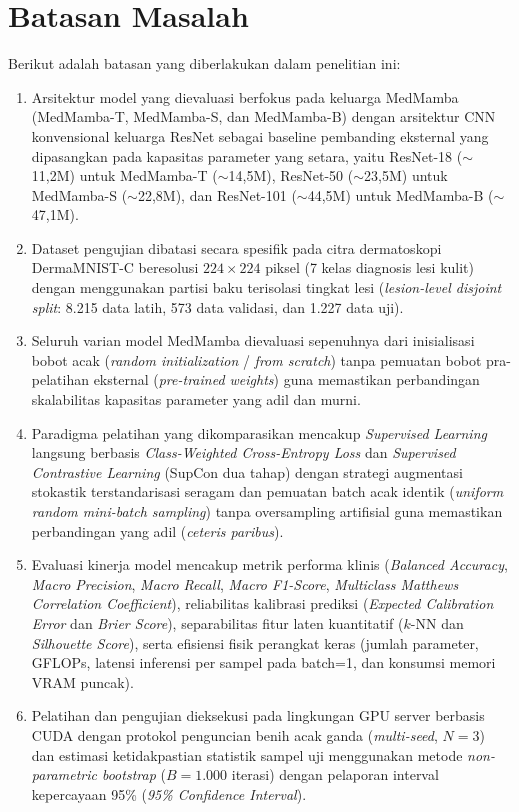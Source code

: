 \section{Batasan Masalah} \label{I.Batasan}
Berikut adalah batasan yang diberlakukan dalam penelitian ini: \par 

\begin{enumerate}[noitemsep]
    \item Arsitektur model yang dievaluasi berfokus pada keluarga MedMamba (MedMamba-T, MedMamba-S, dan MedMamba-B) dengan arsitektur CNN konvensional keluarga ResNet sebagai baseline pembanding eksternal yang dipasangkan pada kapasitas parameter yang setara, yaitu ResNet-18 ($\sim$11,2M) untuk MedMamba-T ($\sim$14,5M), ResNet-50 ($\sim$23,5M) untuk MedMamba-S ($\sim$22,8M), dan ResNet-101 ($\sim$44,5M) untuk MedMamba-B ($\sim$47,1M).
    \item Dataset pengujian dibatasi secara spesifik pada citra dermatoskopi DermaMNIST-C beresolusi $224 \times 224$ piksel (7 kelas diagnosis lesi kulit) dengan menggunakan partisi baku terisolasi tingkat lesi (\textit{lesion-level disjoint split}: 8.215 data latih, 573 data validasi, dan 1.227 data uji).
    \item Seluruh varian model MedMamba dievaluasi sepenuhnya dari inisialisasi bobot acak (\textit{random initialization} / \textit{from scratch}) tanpa pemuatan bobot pra-pelatihan eksternal (\textit{pre-trained weights}) guna memastikan perbandingan skalabilitas kapasitas parameter yang adil dan murni.
    \item Paradigma pelatihan yang dikomparasikan mencakup \textit{Supervised Learning} langsung berbasis \textit{Class-Weighted Cross-Entropy Loss} dan \textit{Supervised Contrastive Learning} (SupCon dua tahap) dengan strategi augmentasi stokastik terstandarisasi seragam dan pemuatan batch acak identik (\textit{uniform random mini-batch sampling}) tanpa oversampling artifisial guna memastikan perbandingan yang adil (\textit{ceteris paribus}).
    \item Evaluasi kinerja model mencakup metrik performa klinis (\textit{Balanced Accuracy}, \textit{Macro Precision}, \textit{Macro Recall}, \textit{Macro F1-Score}, \textit{Multiclass Matthews Correlation Coefficient}), reliabilitas kalibrasi prediksi (\textit{Expected Calibration Error} dan \textit{Brier Score}), separabilitas fitur laten kuantitatif ($k$-NN dan \textit{Silhouette Score}), serta efisiensi fisik perangkat keras (jumlah parameter, GFLOPs, latensi inferensi per sampel pada batch=1, dan konsumsi memori VRAM puncak).
    \item Pelatihan dan pengujian dieksekusi pada lingkungan GPU server berbasis CUDA dengan protokol penguncian benih acak ganda (\textit{multi-seed}, $N=3$) dan estimasi ketidakpastian statistik sampel uji menggunakan metode \textit{non-parametric bootstrap} ($B=1.000$ iterasi) dengan pelaporan interval kepercayaan 95\% (\textit{95\% Confidence Interval}).
\end{enumerate}

